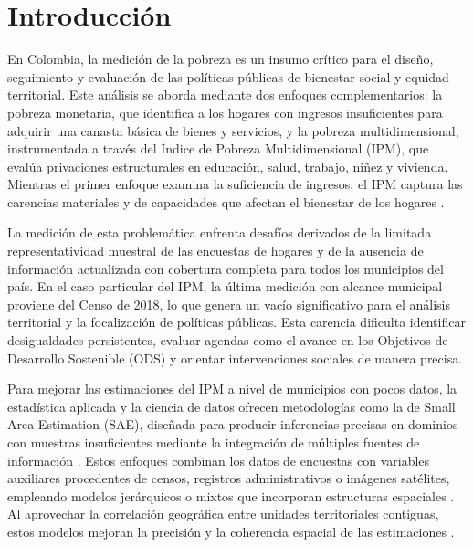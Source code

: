 
\chapter*{Introducción}


En Colombia, la medición de la pobreza es un insumo crítico para el diseño, seguimiento y evaluación de las políticas públicas de bienestar social y equidad territorial. Este análisis se aborda mediante dos enfoques complementarios: la pobreza monetaria, que identifica a los hogares con ingresos insuficientes para adquirir una canasta básica de bienes y servicios, y la pobreza multidimensional, instrumentada a través del Índice de Pobreza Multidimensional (IPM), que evalúa privaciones estructurales en educación, salud, trabajo, niñez y vivienda. Mientras el primer enfoque examina la suficiencia de ingresos, el IPM captura las carencias materiales y de capacidades que afectan el bienestar de los hogares \cite{DANE_PobrezaMultidimensional_2023}.

La medición de esta problemática enfrenta desafíos derivados de la limitada representatividad muestral de las encuestas de hogares y de la ausencia de información actualizada con cobertura completa para todos los municipios del país. En el caso particular del IPM, la última medición con alcance municipal proviene del Censo de 2018, lo que genera un vacío significativo para el análisis territorial y la focalización de políticas públicas. Esta carencia dificulta identificar desigualdades persistentes, evaluar agendas como el avance en los Objetivos de Desarrollo Sostenible (ODS) y orientar intervenciones sociales de manera precisa.

Para mejorar las estimaciones del IPM a nivel de municipios con pocos datos, la estadística aplicada y la ciencia de datos ofrecen metodologías como la de Small Area Estimation (SAE), diseñada para producir inferencias precisas en dominios con muestras insuficientes mediante la integración de múltiples fuentes de información \cite{RaoMolina_2015}. Estos enfoques combinan los datos de encuestas con variables auxiliares procedentes de censos, registros administrativos o imágenes satélites, empleando modelos jerárquicos o mixtos que incorporan estructuras espaciales \cite{MolinaRao_2010}. Al aprovechar la correlación geográfica entre unidades territoriales contiguas, estos modelos mejoran la precisión y la coherencia espacial de las estimaciones \cite{PratesiSalvati_2019}.

